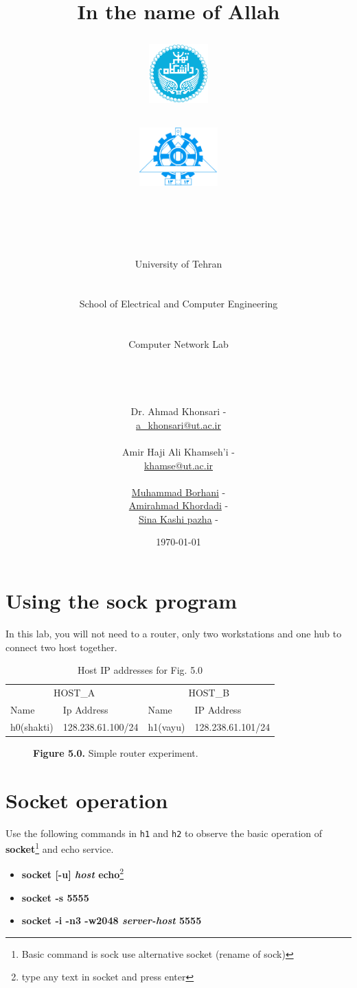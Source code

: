 \documentclass[10pt,a4paper]{article}
\title{
\normalsize In the name of Allah\\
\vspace{10pt}
\LARGE\FR{بسم \allah\  الرحمن الرحیم}
\vspace{10pt}
\begin{center}
	\begin{minipage}{0.48\textwidth} \begin{flushleft}
			\includegraphics[height=64pt,width=64pt]{../img/logo.png}
	\end{flushleft}\end{minipage}
	\begin{minipage}{0.48\textwidth} \begin{flushright}
			\includegraphics[height=64pt]{../img/eng-logo.png}
	\end{flushright}\end{minipage}
\end{center}
\vspace*{-64pt}
	\huge \titleText\\
\vspace{40pt}
}
\author{
	\huge University of Tehran\\
    \LARGE \FR{دانشگاه تهران}\\\\
    \LARGE School of Electrical and Computer Engineering\\
    \FR{دانشکده مهندسی برق و کامپیوتر}\\\\
    \Large Computer Network Lab\\
    \FR{آزمایشگاه شبکه‌های کامپیوتری}\\\\\\\\
    \normalfont
    Dr. Ahmad Khonsari - \FR{احمد خونساری}\\
    \href{mailto:a_khonsari@ut.ac.ir}{a\_khonsari@ut.ac.ir}\\\\
    \normalsize
    Amir Haji Ali Khamseh'i - \FR{امیر حاجی علی خمسه‌ء}\\
    \href{mailto:khamse@ut.ac.ir}{khamse@ut.ac.ir}\\\\
    \normalsize \href{mailto:m.borhani@ut.ac.ir}{Muhammad Borhani} - \FR{محمد برهانی}\\
	\normalsize \href{mailto:a.a.khordadi@ut.ac.ir}{Amirahmad Khordadi} - \FR{امیر احمد خردادی}\\
	\normalsize \href{mailto:sina\_kashipazha@ut.ac.ir}{Sina Kashi pazha} - \FR{سینا کاشی پزها}\\
}
\date{\vspace{30pt}\today\\\vspace{10pt}{\selectlanguage{farsi}\today}}
\numberwithin{equation}{section}
\numberwithin{figure}{section}
\numberwithin{table}{section}
\begin{document}

\maketitle


\pagebreak
\section*{Using the sock program}
	In this lab, you will not need to a router, only two workstations and one hub to connect two host together.
	\begin{table}[H]
        \caption{Host IP addresses for Fig. 5.0}
        \vspace{5pt}
        \centering
        \large
        \begin{tabular}{ *4l }
            \hline \hline
            \multicolumn{2}{c}{HOST\_A} & \multicolumn{2}{c}{HOST\_B} \\
            Name & Ip Address & Name & IP Address \\
            \hline 
            h0(shakti) & 128.238.61.100/24 & h1(vayu) & 128.238.61.101/24\\
            \hline \hline
            \end{tabular}
    \end{table}

    \begin{figure}[H]
        \centering
        \caption{\textbf{Figure 5.0.} Simple router experiment.}        
    \end{figure}

\section{Socket operation}
	Use the following commands in \texttt{h1} and \texttt{h2} to observe the basic operation of \textbf{socket}\footnote{Basic command is sock use alternative socket (rename of sock)} and echo service.
	\begin{itemize}
		\item \textbf{socket [-u] \textit{host} echo}\footnote{type any text in socket and press enter}
		\item \textbf{socket -s 5555}
		\item \textbf{socket -i -n3 -w2048 \textit{server-host} 5555}
	\end{itemize}
\end{document}
